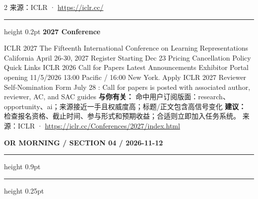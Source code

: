 \documentclass[10.5pt]{ctexart}
\begin{document}
\begin{multicols}{2}
{\footnotesize\color{ormuted} 来源：ICLR · \url{https://iclr.cc/}}
\vspace{2mm}
\hrule height 0.2pt
\vspace{2mm}
{\large\bfseries 2027 Conference}\par
ICLR 2027 The Fifteenth International Conference on Learning Representations California April 26-30, 2027 Register Starting Dec 23 Pricing Cancellation Policy Quick Links ICLR 2026 Call for Papers Latest Announcements Exhibitor Portal opening 11/5/2026 13:00 Pacific / 16:00 New York. Apply ICLR 2027 Reviewer Self-Nomination Form July 28 : Call for papers is posted with associated author, reviewer, AC, and SAC guides 
\textbf{与你有关：} 命中用户订阅版面：research、opportunity、ai；来源接近一手且权威度高；标题/正文包含高信号变化
\textbf{建议：} 检查报名资格、截止时间、参与形式和预期收益；合适则立即加入任务系统。
{\footnotesize\color{ormuted} 来源：ICLR · \url{https://iclr.cc/Conferences/2027/index.html}}
\end{multicols}
\newpage
{\small\bfseries OR MORNING / SECTION 04 / 2026-11-12}
\vspace{2mm}
\hrule height 0.9pt
\vspace{1.5mm}
\hrule height 0.25pt
\vspace{4mm}
\end{document}
